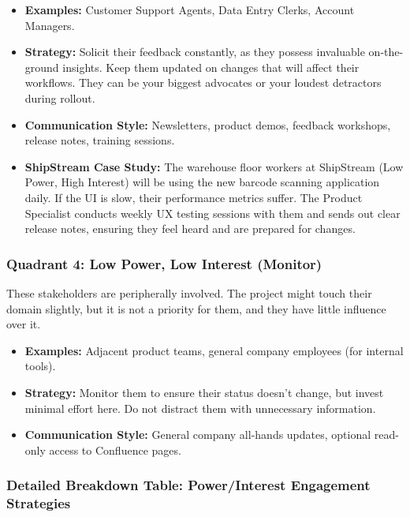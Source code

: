\documentclass[
  11pt,
  openany,
  oneside]{book}
\providecommand{\tightlist}{%
  \setlength{\itemsep}{0pt}\setlength{\parskip}{0pt}}
\begin{document}
\begin{itemize}
\tightlist
\item
  \textbf{Examples:} Customer Support Agents, Data Entry Clerks, Account
  Managers.
\item
  \textbf{Strategy:} Solicit their feedback constantly, as they possess
  invaluable on-the-ground insights. Keep them updated on changes that
  will affect their workflows. They can be your biggest advocates or
  your loudest detractors during rollout.
\item
  \textbf{Communication Style:} Newsletters, product demos, feedback
  workshops, release notes, training sessions.
\item
  \textbf{ShipStream Case Study:} The warehouse floor workers at
  ShipStream (Low Power, High Interest) will be using the new barcode
  scanning application daily. If the UI is slow, their performance
  metrics suffer. The Product Specialist conducts weekly UX testing
  sessions with them and sends out clear release notes, ensuring they
  feel heard and are prepared for changes.
\end{itemize}

\subsubsection{Quadrant 4: Low Power, Low Interest
(Monitor)}\label{quadrant-4-low-power-low-interest-monitor}

These stakeholders are peripherally involved. The project might touch
their domain slightly, but it is not a priority for them, and they have
little influence over it.

\begin{itemize}
\tightlist
\item
  \textbf{Examples:} Adjacent product teams, general company employees
  (for internal tools).
\item
  \textbf{Strategy:} Monitor them to ensure their status doesn't change,
  but invest minimal effort here. Do not distract them with unnecessary
  information.
\item
  \textbf{Communication Style:} General company all-hands updates,
  optional read-only access to Confluence pages.
\end{itemize}

\subsubsection{Detailed Breakdown Table: Power/Interest Engagement
Strategies}\label{detailed-breakdown-table-powerinterest-engagement-strategies}
\end{document}
